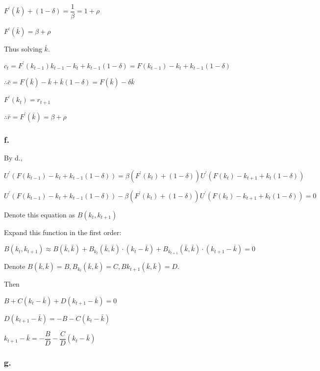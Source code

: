\documentclass{article}
\begin{document}
$F^{\prime}\left(\bar{k}\right)+\left(1-\delta\right)=\dfrac{1}{\beta}=1+\rho$

$F^{\prime}\left(\bar{k}\right)=\beta+\rho$

Thus solving $\bar{k}$.

$c_{t}=F^{\prime}\left(k_{t-1}\right)k_{t-1}-k_{t}+k_{t-1}\left(1-\delta\right)=F\left(k_{t-1}\right)-k_{t}+k_{t-1}\left(1-\delta\right)$

$\therefore \bar{c}=F\left(\bar{k}\right)-\bar{k}+\bar{k}\left(1-\delta\right)=F\left(\bar{k}\right)-\delta\bar{k}$

$F^{\prime}\left(k_{t}\right)=r_{t+1}$

$\therefore \bar{r}=F^{\prime}\left(\bar{k}\right)=\beta+\rho$

\subsubsection*{\textrm{f.}}

By \textrm{d.},

$U^{\prime}\left(F\left(k_{t-1}\right)-k_{t}+k_{t-1}\left(1-\delta\right)\right)=\beta\left(F^{\prime}\left(k_{t}\right)+\left(1-\delta\right)\right)U^{\prime}\left(F\left(k_{t}\right)-k_{t+1}+k_{t}\left(1-\delta\right)\right)$

$U^{\prime}\left(F\left(k_{t-1}\right)-k_{t}+k_{t-1}\left(1-\delta\right)\right)-\beta\left(F^{\prime}\left(k_{t}\right)+\left(1-\delta\right)\right)U^{\prime}\left(F\left(k_{t}\right)-k_{t+1}+k_{t}\left(1-\delta\right)\right)=0$

Denote this equation as $B\left(k_{t}, k_{t+1}\right)$

Expand this function in the first order:

$B\left(k_{t}, k_{t+1}\right)\approx B\left(\bar{k},\bar{k}\right)+B_{k_{t}}\left(\bar{k},\bar{k}\right)\cdot\left(k_{t}-\bar{k}\right)+B_{k_{t+1}}\left(\bar{k},\bar{k}\right)\cdot\left(k_{t+1}-\bar{k}\right)=0$

Denote $B\left(\bar{k},\bar{k}\right)=B,B_{k_{t}}\left(\bar{k},\bar{k}\right)=C, B{k_{t+1}}\left(\bar{k},\bar{k}\right)=D$.

Then

$B+C\left(k_{t}-\bar{k}\right)+D\left(k_{t+1}-\bar{k}\right)=0$

$D\left(k_{t+1}-\bar{k}\right)=-B-C\left(k_{t}-\bar{k}\right)$

$k_{t+1}-\bar{k}=-\dfrac{B}{D}-\dfrac{C}{D}\left(k_{t}-\bar{k}\right)$

\subsubsection*{\textrm{g.}}
\end{document}
